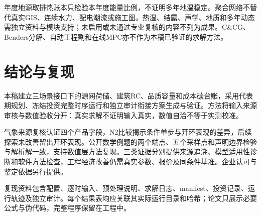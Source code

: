 \documentclass[12pt,a4paper]{article}
\begin{document}
年度地源取排热账本只检验本年度能量比例，不证明多年地温稳定。聚合网络不替代真实GIS、连续水力、配电潮流或施工图。热湿、结露、声学、地质和多年动态需独立资料与模块支持；未启用或未通过专业复核的内容不列为成果。C\&CG、Benders分解、自动工程割和在线MPC亦不作为本稿已验证的求解方法。

\clearpage
\section{结论与复现}

本稿建立三场景接口下的源网荷储、建筑RC、品质容量和成本碳台账，采用代表期规划、冻结投资完整时序运行和独立审计衔接方案生成与验证。方法将输入来源审核与数值验收分开：真实求解不证明输入真实，数值自洽不等于实测校准。

气象来源复核认证四个产品字段，N2比较揭示条件单步与开环表现的差异，后续探索未改善留出开环表现。公开数学例题的两个端点、五个采样点和声明边界检验与解析解一致，支持数值层方法复现。三类证据分别提供来源追溯、模型适用性诊断和软件方法检查，工程经济改善仍需真实参数、报价及同条件基准。企业认可与鉴定依据另行提供。

复现资料包含配置、逐时输入、预处理说明、求解日志、manifest、投资记录、运行轨迹及独立审计。每个结果表均应关联其实际运行目录和哈希；论文只展示必要公式与伪代码，完整程序保留在工程中。
\end{document}
